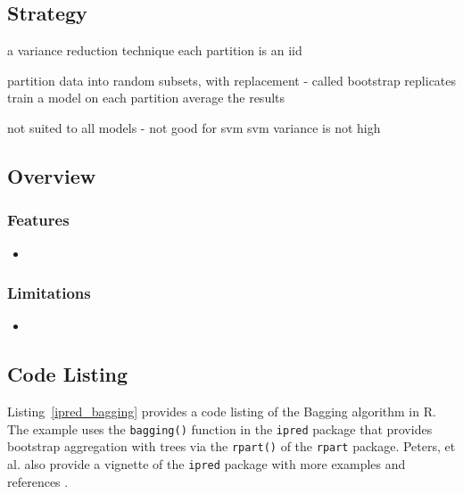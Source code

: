 \subsection{Strategy}

a variance reduction technique
 each partition is an iid

partition data into random subsets, with replacement - called bootstrap replicates
train a model on each partition
average the results

not suited to all models - not good for svm
svm variance is not high

\subsection{Overview}

\subsubsection{Features}

\begin{itemize}
	\item 
\end{itemize}

\subsubsection{Limitations}

\begin{itemize}
	\item 
\end{itemize}


\subsection{Code Listing}
Listing~\ref{ipred_bagging} provides a code listing of the Bagging algorithm in R.
The example uses the \texttt{bagging()} function in the \texttt{ipred} package \cite{Peters2011} that provides bootstrap aggregation with trees via the \texttt{rpart()} of the \texttt{rpart} package.
Peters, et al. also provide a vignette of the \texttt{ipred} package with more examples and references \cite{Peters2011a}.

